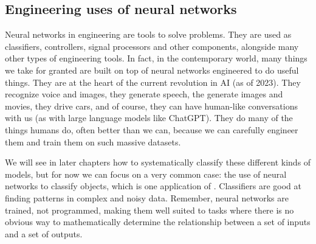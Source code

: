 \subsection{Engineering uses of neural networks}\label{machineLearning}


Neural networks in engineering are tools to solve problems. They are used as classifiers, controllers, signal processors and other components, alongside many other types of engineering tools. In fact, in the contemporary world, many things we take for granted are built on top of neural networks engineered to do useful things. They are at the heart of the current revolution in AI (as of 2023). They recognize voice and images, they generate speech, the generate images and movies, they drive cars, and of course, they can have human-like conversations with us (as with large language models like ChatGPT). They do many of the things humans do, often better than we can, because we can carefully engineer them and train them on such massive datasets.

We will see in later chapters how to systematically classify these different kinds of models, but for now we can focus on a very common case: the use of neural networks to classify objects, which is  one application of  . Classifiers are good at  finding patterns in complex and noisy data. Remember, neural networks are trained, not programmed, making them well suited to tasks where there is no obvious way to mathematically determine the relationship between a set of inputs and a set of outputs.


